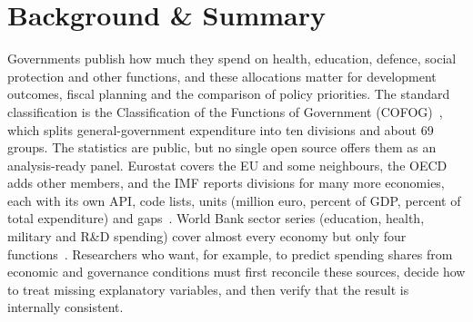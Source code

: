 \documentclass[11pt,a4paper]{article}
\DeclareRobustCommand*{\_}{\textunderscore\hskip0pt\relax}
\begin{document}
\section{Background \& Summary}\label{sec:intro}
Governments publish how much they spend on health, education, defence, social protection and other functions, and these allocations matter for development outcomes, fiscal planning and the comparison of policy priorities. The standard classification is the Classification of the Functions of Government (COFOG)~\cite{un2000cofog}, which splits general-government expenditure into ten divisions and about 69 groups. The statistics are public, but no single open source offers them as an analysis-ready panel. Eurostat covers the EU and some neighbours, the OECD adds other members, and the IMF reports divisions for many more economies, each with its own API, code lists, units (million euro, percent of GDP, percent of total expenditure) and gaps~\cite{eurostat_cofog,oecd_table11,imf_gfs}. World Bank sector series (education, health, military and R\&D spending) cover almost every economy but only four functions~\cite{wdi}. Researchers who want, for example, to predict spending shares from economic and governance conditions must first reconcile these sources, decide how to treat missing explanatory variables, and then verify that the result is internally consistent.
\end{document}

